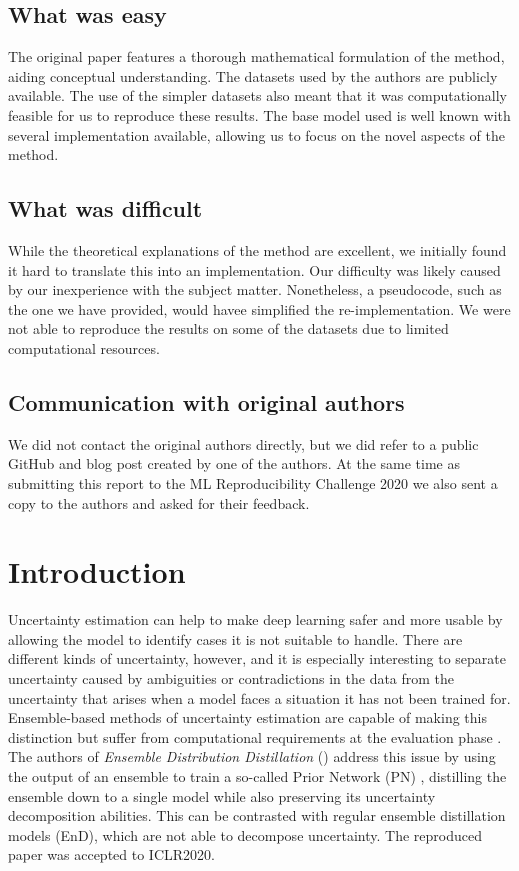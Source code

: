 \subsection*{What was easy}

The original paper features a thorough mathematical formulation of the method, aiding conceptual understanding. The datasets used by the authors are publicly available. The use of the simpler datasets also meant that it was computationally feasible for us to reproduce these results. The base model used is well known with several implementation available, allowing us to focus on the novel aspects of the method. 


\subsection*{What was difficult}

While the theoretical explanations of the method are excellent, we initially found it hard to translate this into an implementation. Our difficulty was likely caused by our inexperience with the subject matter. Nonetheless, a pseudocode, such as the one we have provided, would havee simplified the re-implementation. We were not able to reproduce the results on some of the datasets due to limited computational resources.

\subsection*{Communication with original authors}
We did not contact the original authors directly, but we did refer to a public GitHub and blog post created by one of the  authors. At the same time as submitting this report to the ML Reproducibility Challenge 2020 we also sent a copy to the authors and asked for their feedback.

\newpage


\section{Introduction}
\label{sec:introduction}

Uncertainty estimation can help to make deep learning safer and more usable by allowing the model to identify cases it is not suitable to handle. There are different kinds of uncertainty, however, and it is especially interesting to separate uncertainty caused by ambiguities or contradictions in the data from the uncertainty that arises when a model faces a situation it has not been trained for. Ensemble-based methods of uncertainty estimation are capable of making this distinction but suffer from computational requirements at the evaluation phase \cite{Lakshminarayanan2017}. The authors of \textit{Ensemble Distribution Distillation} (\EnDD) \cite{malinin2019ensemble} address this issue by using the output of an ensemble to train a so-called Prior Network (PN) \cite{NIPS2018_7936}, distilling the ensemble down to a single model while also preserving its uncertainty decomposition abilities. This can be contrasted with regular ensemble distillation models \cite{hinton2015distilling} (EnD), which are not able to decompose uncertainty. The reproduced paper was accepted to ICLR2020.


